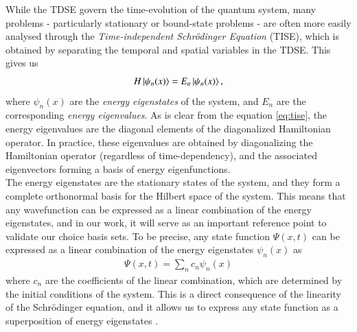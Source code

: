 \documentclass{subfiles}
\begin{document}
While the TDSE govern the time-evolution of the quantum system, many problems - particularly stationary or bound-state problems - are often more easily analysed through the \emph{Time-independent Schrödinger Equation} (TISE), which is obtained by separating the temporal and spatial variables in the TDSE. This gives us
\begin{equation}
    H\ket{\psi_n(x)} = E_n\ket{\psi_n(x)}\label{eq:tise},
\end{equation}
where $\psi_n(x)$ are the \emph{energy eigenstates} of the system, and $E_n$ are the corresponding \emph{energy eigenvalues}. As is clear from the equation \eqref{eq:tise}, the energy eigenvalues are the diagonal elements of the diagonalized Hamiltonian operator. In practice, these eigenvalues are obtained by diagonalizing the Hamiltonian operator (regardless of time-dependency), and the associated eigenvectors forming a basis of energy eigenfunctions. \\

The energy eigenstates are the stationary states of the system, and they form a complete orthonormal basis for the Hilbert space of the system. This means that any wavefunction can be expressed as a linear combination of the energy eigenstates, and in our work, it will serve as an important reference point to validate our choice basis sets. To be precise, any state function $\Psi(x, t)$ can be expressed as a linear combination of the energy eigenstates $\psi_n(x)$ as
\begin{align*}
    \Psi(x, t) = \sum_n c_n\psi_n(x)
\end{align*}
where $c_n$ are the coefficients of the linear combination, which are determined by the initial conditions of the system. This is a direct consequence of the linearity of the Schrödinger equation, and it allows us to express any state function as a superposition of energy eigenstates \cite{griffiths2018introduction, berera2021quantum}.

\end{document}
